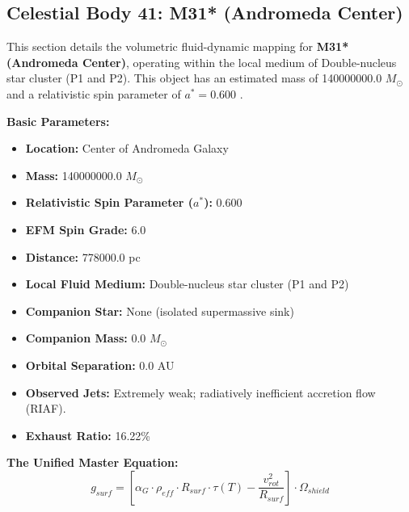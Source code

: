 \documentclass[11pt, a4paper]{article}
\begin{document}
\clearpage
\subsection{Celestial Body 41: M31* (Andromeda Center)}
This section details the volumetric fluid-dynamic mapping for \textbf{M31* (Andromeda Center)}, operating within the local medium of Double-nucleus star cluster (P1 and P2). This object has an estimated mass of 140000000.0 $M_{\odot}$ and a relativistic spin parameter of $a^* = 0.600$ \cite{bender2005, ned}.

\vspace{0.5em}
\noindent \textbf{Basic Parameters:}
\begin{itemize}
  \item \textbf{Location:} Center of Andromeda Galaxy
  \item \textbf{Mass:} 140000000.0 $M_{\odot}$
  \item \textbf{Relativistic Spin Parameter ($a^*$):} 0.600
  \item \textbf{EFM Spin Grade:} 6.0
  \item \textbf{Distance:} 778000.0 pc
  \item \textbf{Local Fluid Medium:} Double-nucleus star cluster (P1 and P2)
  \item \textbf{Companion Star:} None (isolated supermassive sink)
  \item \textbf{Companion Mass:} 0.0 $M_{\odot}$
  \item \textbf{Orbital Separation:} 0.0 AU
  \item \textbf{Observed Jets:} Extremely weak; radiatively inefficient accretion flow (RIAF).
  \item \textbf{Exhaust Ratio:} 16.22\%
\end{itemize}

\vspace{0.5em}
\noindent \textbf{The Unified Master Equation:}
$$ g_{surf} = \left[ \alpha_G \cdot \rho_{eff} \cdot R_{surf} \cdot \tau(T) - \frac{v_{rot}^2}{R_{surf}} \right] \cdot \Omega_{shield} $$
\end{document}
